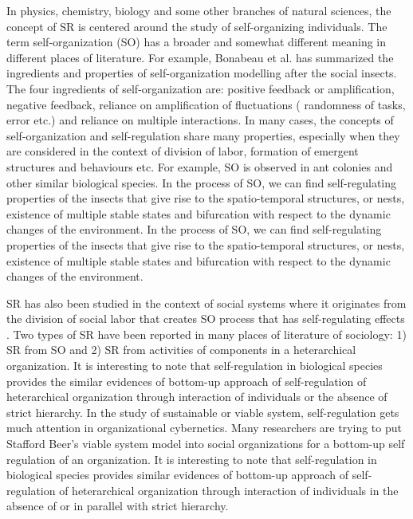 In physics, chemistry, biology and some other branches of natural sciences, the concept of SR is centered around the study of self-organizing individuals. The term self-organization (SO) has a broader and somewhat different meaning in different places of literature. 
For example, Bonabeau et al. \cite{Bonabeau+1999} has summarized the ingredients and properties of  self-organization modelling after the social insects. The four ingredients of self-organization are:
positive feedback or amplification, 
negative feedback, 
reliance on amplification of fluctuations ( randomness of  tasks, error etc.) and 
reliance on multiple interactions. 
In many cases, the concepts of self-organization and self-regulation share many properties, especially when they are considered in the context of division of labor, formation of emergent structures and behaviours etc. For example,  SO is observed in ant colonies and other similar biological species. In the process of SO, we can find self-regulating properties of the insects that give rise to the spatio-temporal  structures, or nests, existence of multiple stable states and bifurcation with respect to the dynamic changes of the environment. In the process of SO, we can find self-regulating properties of the insects that give rise to the spatio-temporal structures, or nests, existence of multiple stable states and bifurcation with respect to the dynamic changes of the environment.

SR has also been studied in the context of social systems where it originates from the division of social labor that creates SO process that has self-regulating effects \cite{Kppers+1990}. Two types of SR have been reported in many places of literature of sociology: 1) SR from SO and 2) SR from activities of components in a heterarchical organization. It is interesting to note that self-regulation in biological species provides the similar evidences of bottom-up approach of self-regulation of heterarchical organization through interaction of individuals or the absence of strict hierarchy. In the study of sustainable or viable system, self-regulation gets much attention in organizational cybernetics. Many researchers are trying to put Stafford Beer's viable system model \cite{Beer1981} into social organizations for a bottom-up self regulation of an organization.  
It is interesting to note that self-regulation in biological species provides similar evidences of bottom-up approach of self-regulation of heterarchical organization through interaction of individuals in the absence of or in parallel with strict hierarchy. 

